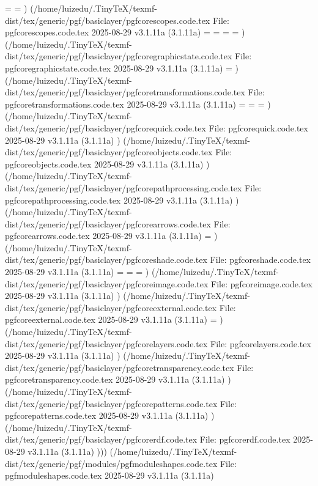 \pgf@shorten@end@additional=
\pgf@shorten@start@additional=
) (/home/luizedu/.TinyTeX/texmf-dist/tex/generic/pgf/basiclayer/pgfcorescopes.code.tex
File: pgfcorescopes.code.tex 2025-08-29 v3.1.11a (3.1.11a)
\pgfpic=
\pgf@hbox=
\pgf@layerbox@main=
\pgf@picture@serial@count=
) (/home/luizedu/.TinyTeX/texmf-dist/tex/generic/pgf/basiclayer/pgfcoregraphicstate.code.tex
File: pgfcoregraphicstate.code.tex 2025-08-29 v3.1.11a (3.1.11a)
\pgflinewidth=
) (/home/luizedu/.TinyTeX/texmf-dist/tex/generic/pgf/basiclayer/pgfcoretransformations.code.tex
File: pgfcoretransformations.code.tex 2025-08-29 v3.1.11a (3.1.11a)
\pgf@pt@x=
\pgf@pt@y=
\pgf@pt@temp=
) (/home/luizedu/.TinyTeX/texmf-dist/tex/generic/pgf/basiclayer/pgfcorequick.code.tex
File: pgfcorequick.code.tex 2025-08-29 v3.1.11a (3.1.11a)
) (/home/luizedu/.TinyTeX/texmf-dist/tex/generic/pgf/basiclayer/pgfcoreobjects.code.tex
File: pgfcoreobjects.code.tex 2025-08-29 v3.1.11a (3.1.11a)
) (/home/luizedu/.TinyTeX/texmf-dist/tex/generic/pgf/basiclayer/pgfcorepathprocessing.code.tex
File: pgfcorepathprocessing.code.tex 2025-08-29 v3.1.11a (3.1.11a)
) (/home/luizedu/.TinyTeX/texmf-dist/tex/generic/pgf/basiclayer/pgfcorearrows.code.tex
File: pgfcorearrows.code.tex 2025-08-29 v3.1.11a (3.1.11a)
\pgfarrowsep=
) (/home/luizedu/.TinyTeX/texmf-dist/tex/generic/pgf/basiclayer/pgfcoreshade.code.tex
File: pgfcoreshade.code.tex 2025-08-29 v3.1.11a (3.1.11a)
\pgf@max=
\pgf@sys@shading@range@num=
\pgf@shadingcount=
) (/home/luizedu/.TinyTeX/texmf-dist/tex/generic/pgf/basiclayer/pgfcoreimage.code.tex
File: pgfcoreimage.code.tex 2025-08-29 v3.1.11a (3.1.11a)
) (/home/luizedu/.TinyTeX/texmf-dist/tex/generic/pgf/basiclayer/pgfcoreexternal.code.tex
File: pgfcoreexternal.code.tex 2025-08-29 v3.1.11a (3.1.11a)
\pgfexternal@startupbox=
) (/home/luizedu/.TinyTeX/texmf-dist/tex/generic/pgf/basiclayer/pgfcorelayers.code.tex
File: pgfcorelayers.code.tex 2025-08-29 v3.1.11a (3.1.11a)
) (/home/luizedu/.TinyTeX/texmf-dist/tex/generic/pgf/basiclayer/pgfcoretransparency.code.tex
File: pgfcoretransparency.code.tex 2025-08-29 v3.1.11a (3.1.11a)
) (/home/luizedu/.TinyTeX/texmf-dist/tex/generic/pgf/basiclayer/pgfcorepatterns.code.tex
File: pgfcorepatterns.code.tex 2025-08-29 v3.1.11a (3.1.11a)
) (/home/luizedu/.TinyTeX/texmf-dist/tex/generic/pgf/basiclayer/pgfcorerdf.code.tex
File: pgfcorerdf.code.tex 2025-08-29 v3.1.11a (3.1.11a)
))) (/home/luizedu/.TinyTeX/texmf-dist/tex/generic/pgf/modules/pgfmoduleshapes.code.tex
File: pgfmoduleshapes.code.tex 2025-08-29 v3.1.11a (3.1.11a)
